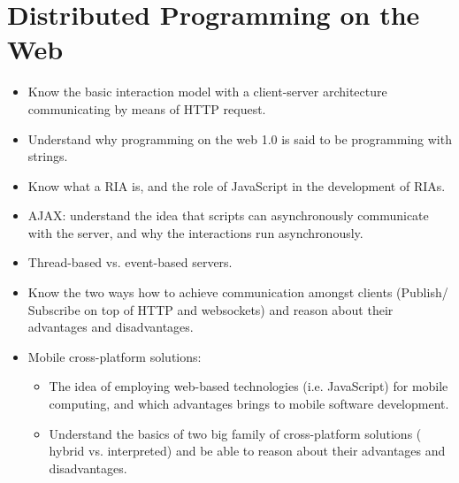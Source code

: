 \documentclass[a4paper]{report}
\begin{document}
\chapter{Distributed Programming on the Web}
\begin{itemize}
\item Know the basic interaction model with a client-server architecture communicating by
means of HTTP request.
\item Understand why programming on the web 1.0 is said to be programming with strings.
\item Know what a RIA is, and the role of JavaScript in the development of RIAs.
\item AJAX: understand the idea that scripts can asynchronously communicate with the
server, and why the interactions run asynchronously.
\item Thread-based vs. event-based servers.
\item Know the two ways how to achieve communication amongst clients (Publish/
Subscribe on top of HTTP and websockets) and reason about their advantages and
disadvantages.
\item Mobile cross-platform solutions:
\begin{itemize}
\item The idea of employing web-based technologies (i.e. JavaScript) for mobile
computing, and which advantages brings to mobile software development.
\item Understand the basics of two big family of cross-platform solutions ( hybrid vs.
interpreted) and be able to reason about their advantages and disadvantages.
\end{itemize}
\end{itemize}
\end{document}
